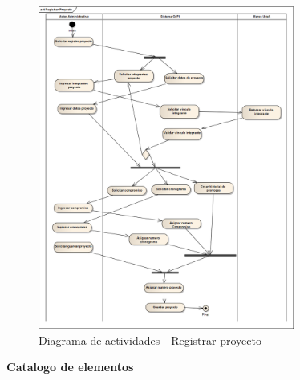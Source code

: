 \documentclass[12pt,oneside,letterpaper]{report}
\begin{document}
\begin{figure}[h!]
  \centering
    \includegraphics[width=0.75\textwidth]{./img/img11.png}
  \caption{Diagrama de actividades - Registrar proyecto}
\end{figure}


\textbf{Catalogo de elementos}\\
\end{document}
